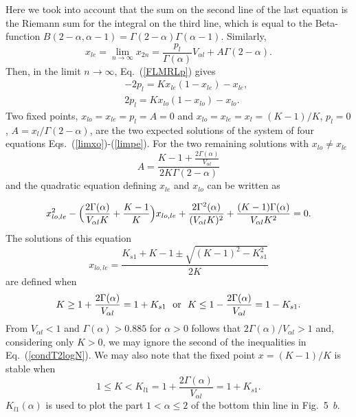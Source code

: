 \documentclass[graybox]{svmult}
\begin{document}
Here we took into account that the sum on the second line of the last equation is the Riemann sum for the integral on the third line, which is equal to the Beta-function 
$B(2-\alpha,\alpha-1)=\Gamma(2-\alpha)\Gamma(\alpha-1)$.
 Similarly, 
\begin{equation} \label{limxe} 
x_{le}=\lim_{n \rightarrow \infty}x_{2n}=\frac{p_l}{\Gamma(\alpha)}V_{\alpha l}+A \Gamma(2-\alpha).
\end{equation}
Then, in the limit $n \rightarrow \infty$,   Eq.~(\ref{FLMRLp}) gives
{\setlength\arraycolsep{0.5pt}
\begin{eqnarray}
\label{limpo}
&&-2p_{l}=Kx_{le}(1-x_{le})-x_{le} ,  \\
&&2p_{l}=Kx_{lo}(1-x_{lo})-x_{lo}.
\label{limpe}
\end{eqnarray}
}
Two fixed points, $x_{lo}=x_{le}=p_{l}=A=0$ 
and $x_{lo}=x_{le}=x_l=(K-1)/K$, $p_{l}=0$, $A=x_l/\Gamma (2-\alpha)$,
are the two expected solutions of the system of four equations Eqs.~(\ref{limxo})-(\ref{limpe}). For the two remaining solutions with 
$x_{lo} \ne x_{le}$
\begin{equation} \label{A} 
A= \frac{K-1+\frac{2\Gamma(\alpha)}{V_{\alpha l}}}{2K\Gamma(2-\alpha)}
\end{equation}
and the quadratic equation defining $x_{le}$ and $x_{lo}$ can be written as 

\begin{equation}
x_{lo,le}^2-\Bigl( \frac{2\Gamma(\alpha)}{V_{\alpha l}K} 
+\frac{K-1}{K}  \Bigr)x_{lo,le} +
\frac{2\Gamma^2(\alpha)}{(V_{\alpha l}K)^2}
+\frac{(K-1)\Gamma(\alpha)}{V_{\alpha l}K^2}=0.
\label{eqT2logn}
\end{equation}
The solutions of this equation  
\begin{equation}
x_{lo,le}=\frac{K_{s1}+K-1 \pm \sqrt{(K-1)^2-K_{s1}^2}}{2K}
\label{eqT2logSolun}
\end{equation}
are defined when
\begin{equation}
K \ge 1 + \frac{2\Gamma(\alpha)}{V_{\alpha l}}=1+K_{s1} \ \ {\rm or} \ \
K \le 1 - \frac{2\Gamma(\alpha)}{V_{\alpha l}}=1-K_{s1}.
\label{condT2logN}
\end{equation}
From  $V_{\alpha l}<1$ and $\Gamma(\alpha)>0.885$ for $\alpha>0$
follows that $ 2\Gamma(\alpha)/V_{\alpha l}>1$ and, considering 
only $K>0$,  we may ignore the
second of the inequalities in Eq.~(\ref{condT2logN}). 
We may also note that
the fixed point $x=(K-1)/K$ is stable when
\begin{equation}
1 \le K <K_{l1}= 1 + \frac{2\Gamma(\alpha)}{V_{\alpha l}}=1+K_{s1}.
\label{condT2lognN}
\end{equation} 
$K_{l1}(\alpha)$ is used to plot the part $1<\alpha \le2$ of the bottom thin line in 
Fig.~5~$b$. 
\end{document}

